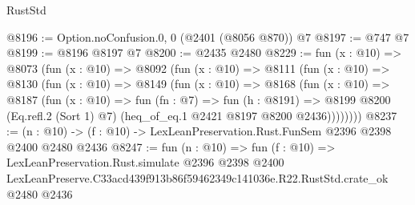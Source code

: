\begin{lexlean}{RustStd}
\begin{coremodule}
@8196 := Option.noConfusion.{0, 0} (@2401 (@8056 @870)) @7
@8197 := @747 @7
@8199 := @8196 @8197 @7
@8200 := @2435 @2480
@8229 := fun (x : @10) =>
  @8073
    (fun (x : @10) =>
    @8092
      (fun (x : @10) =>
      @8111
        (fun (x : @10) =>
        @8130
          (fun (x : @10) =>
          @8149
            (fun (x : @10) =>
            @8168
              (fun (x : @10) =>
              @8187
                (fun (x : @10) =>
                fun (fn : @7) =>
                fun (h : @8191) =>
                @8199 @8200 (Eq.refl.{2} (Sort 1) @7) (heq_of_eq.{1} @2421 @8197 @8200 @2436))))))))
@8237 := (n : @10) -> (f : @10) -> LexLeanPreservation.Rust.FunSem @2396 @2398 @2400 @2480 @2436
@8247 := fun (n : @10) =>
  fun (f : @10) =>
  LexLeanPreservation.Rust.simulate
    @2396
    @2398
    @2400
    LexLeanPreserve.C33acd439f913b86f59462349c141036e.R22.RustStd.crate_ok
    @2480
    @2436
\end{coremodule}
\end{lexlean}
